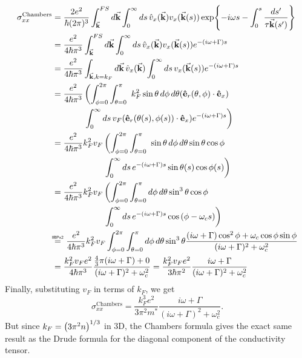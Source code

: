 \documentclass[12pt]{article}
\newcommand\myeq{\mathrel{\overset{\makebox[0pt]{\mbox{\normalfont\tiny\sffamily IBPx2}}}{=}}}
\begin{document}
\begin{align}
	\sigma_{xx}^{\text{Chambers}} &= \frac{2e^2}{\hbar(2\pi)^3}\displaystyle\int_{\va{k}}^{FS}\mathop{d\va{k}}\int_0^{\infty}\mathop{ds}
		\hat{v}_x(\va{k})v_x(\va{k}(s))
		\exp{-i\omega s - \int_0^s \frac{\mathop{ds'}}{\tau \va{k}(s')}} \\
	&= \frac{e^2}{4\hbar\pi^3}\displaystyle\int_{\va{k}}^{FS}\mathop{d\va{k}}\int_0^{\infty}\mathop{ds}
	\hat{v}_x(\va{k})v_x(\va{k}(s))
		e^{-(i\omega + \Gamma)s} \\
	&= \frac{e^2}{4\hbar\pi^3}\displaystyle\int_{\va{k}, k = k_F}^{}\mathop{d\va{k}} \hat{v}_x(\va{k}) 
		\int_0^{\infty}\mathop{ds} v_x(\va{k}(s)) e^{-(i\omega + \Gamma)s} \\
	&= \begin{aligned}[t] \frac{e^2}{4\hbar\pi^3}&\left(\displaystyle\int_{\phi = 0}^{2\pi}\int_{\theta = 0}^{\pi}\ k_F^2\sin{\theta}\mathop{d\phi}\mathop{d\theta}(\vu{e}_r(\theta, \phi)\cdot \vu{e}_x)\right. \\
		&\left.\int_0^{\infty}\mathop{ds} v_F (\vu{e}_r(\theta(s), \phi(s))\cdot \vu{e}_x) e^{-(i\omega + \Gamma)s}\right) \end{aligned} \\
	&= \begin{aligned}[t] \frac{e^2}{4\hbar\pi^3}k_F^2v_F&\left(\displaystyle\int_{\phi = 0}^{2\pi}\int_{\theta = 0}^{\pi}\ \sin{\theta}\mathop{d\phi}\mathop{d\theta} \sin{\theta}\cos{\phi} \right. \\
		&\left.\int_0^{\infty}\mathop{ds} e^{-(i\omega + \Gamma)s} \sin{\theta(s)}\cos{\phi(s)}\right) \end{aligned} \\
	&= \begin{aligned}[t] \frac{e^2}{4\hbar\pi^3}k_F^2v_F&\left(\displaystyle\int_{\phi = 0}^{2\pi}\int_{\theta = 0}^{\pi} \mathop{d\phi}\mathop{d\theta} \sin^3{\theta}\cos{\phi} \right. \\
		&\left.\int_0^{\infty}\mathop{ds} e^{-(i\omega + \Gamma)s} \cos{(\phi - \omega_c s)}\right) \end{aligned} \\
	&\myeq\ \frac{e^2}{4\hbar\pi^3}k_F^2v_F\displaystyle\int_{\phi = 0}^{2\pi}\int_{\theta = 0}^{\pi} \mathop{d\phi}\mathop{d\theta} \sin^3{\theta}\frac{(i\omega + \Gamma)\cos^2{\phi}+\omega_c\cos\phi\sin\phi}{(i\omega + \Gamma)^2 + \omega_c^2} \\
	&= \frac{k_F^2v_Fe^2}{4\hbar\pi^3}\frac{\frac{4}{3}\pi(i\omega + \Gamma) + 0}{(i\omega + \Gamma)^2 + \omega_c^2} = \frac{k_F^2v_Fe^2}{3\hbar\pi^2}\frac{i\omega + \Gamma}{(i\omega + \Gamma)^2 + \omega_c^2}
\end{align}
Finally, substituting $v_F$ in terms of $k_F$, we get
\begin{equation}
	\sigma_{xx}^{\text{Chambers}} = \frac{k_F^3e^2}{3\pi^2m^*}\frac{i\omega + \Gamma}{(i\omega + \Gamma)^2 + \omega_c^2}.
\end{equation}
But since $k_F = \qty(3\pi^2n)^{1/3}$ in 3D, the Chambers formula gives the exact same result as the
Drude formula for the diagonal component of the conductivity tensor.
\end{document}
